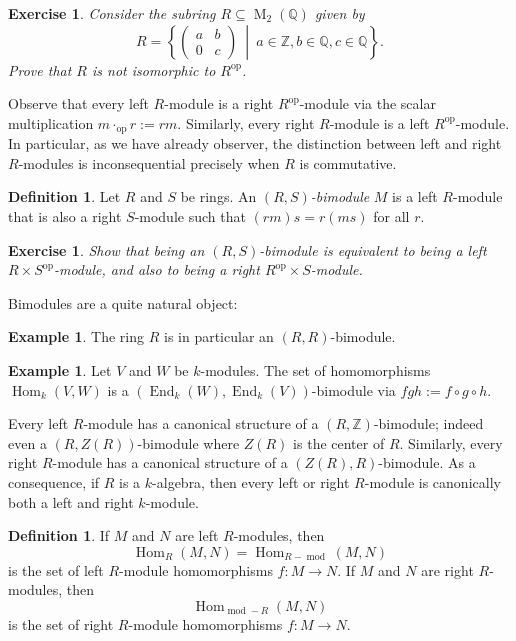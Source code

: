 \documentclass[12pt]{article}
\theoremstyle{plain}
\newtheorem{exercise}[theorem]{Exercise}
\theoremstyle{definition}
\newtheorem{definition}[theorem]{Definition}
\newtheorem{example}[theorem]{Example}
\theoremstyle{remark}
\numberwithin{equation}{section}
\begin{document}
\begin{exercise}
Consider the subring $R \subseteq \operatorname{M}_2(\mathbb{Q})$
given by
\[
R = \left\{ \begin{pmatrix} a & b\\ 0 & c \end{pmatrix}\ \middle|\
a \in \mathbb{Z}, b \in \mathbb{Q}, c \in \mathbb{Q} \right\}.
\]
Prove that $R$ is not isomorphic to $R^{\mathrm{op}}$.
\end{exercise}

Observe that every left $R$-module is a right $R^{\mathrm{op}}$-module
via the scalar multiplication $m \cdot_{\mathrm{op}} r := rm$.
Similarly, every right $R$-module is a left $R^{\mathrm{op}}$-module.
In particular, as we have already observer,
the distinction between left and right
$R$-modules is inconsequential precisely when $R$ is commutative.

\begin{definition}
Let $R$ and $S$ be rings.  An \emph{$(R,S)$-bimodule} $M$ is a left
$R$-module that is also a right $S$-module such that $(rm)s=r(ms)$ for
all $r$.
\end{definition}

\begin{exercise}
Show that being an $(R,S)$-bimodule is equivalent to being a
left $R \times S^{\mathrm{op}}$-module, and also to being
a right $R^{\mathrm{op}} \times S$-module.
\end{exercise}

Bimodules are a quite natural object:

\begin{example}
The ring $R$ is in particular an $(R,R)$-bimodule.
\end{example}

\begin{example}
Let $V$ and $W$ be $k$-modules.  The set of homomorphisms
$\operatorname{Hom}_k(V,W)$ is a
$(\operatorname{End}_k(W),\operatorname{End}_k(V))$-bimodule
via $fgh := f \circ g \circ h$.
\end{example}

Every left $R$-module has a canonical structure of a
$(R,\mathbb{Z})$-bimodule; indeed even a $(R,Z(R))$-bimodule where
$Z(R)$ is the center of $R$.
Similarly, every right $R$-module has a canonical structure of
a $(Z(R),R)$-bimodule.
As a consequence, if $R$ is a $k$-algebra, then every left or right
$R$-module is canonically both a left and right $k$-module.

\begin{definition}
If $M$ and $N$ are left $R$-modules, then
\[
\operatorname{Hom}_R(M,N) = \operatorname{Hom}_{R-\operatorname{mod}}(M,N)
\]
is the set of left $R$-module homomorphisms $f : M \to N$.
If $M$ and $N$ are right $R$-modules, then
\[
\operatorname{Hom}_{\operatorname{mod}-R}(M,N)
\]
is the set of right $R$-module homomorphisms $f : M \to N$.
\end{definition}
\end{document}
